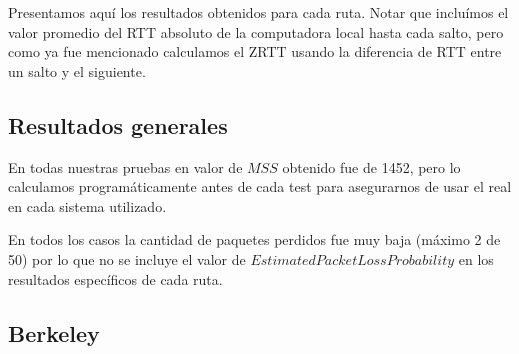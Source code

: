 Presentamos aquí los resultados obtenidos para cada ruta. Notar que incluímos el valor promedio del RTT absoluto de la computadora local hasta cada salto, pero como ya fue mencionado calculamos el ZRTT usando la diferencia de RTT entre un salto y el siguiente.

\subsection{Resultados generales}
 En todas nuestras pruebas en valor de $MSS$ obtenido fue de 1452, pero lo calculamos programáticamente antes de cada test para asegurarnos de usar el real en cada sistema utilizado. 
 
 En todos los casos la cantidad de paquetes perdidos fue muy baja (máximo 2 de 50) por lo que no se incluye el valor de $EstimatedPacketLossProbability$ en los resultados específicos de cada ruta.
 
\subsection{Berkeley}

